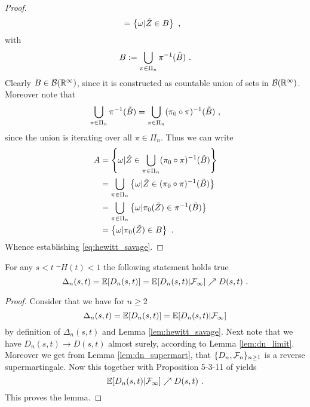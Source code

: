 \begin{lemma}
\begin{proof}
\begin{align*}
		&= \left\{\omega | \tilde{Z} \in B\right\}\textrm{ ,}
		\end{align*}		
		with 
		$$B:=\bigcup\limits_{\pi\in\Pi_n}\pi^{-1}(\tilde{B})\textrm{ .}$$
		Clearly $B\in\mathcal{B}(\mathbb{R}^\infty)$, since it is constructed as countable union of sets in $\mathcal{B}(\mathbb{R}^\infty)$.
		Moreover note that 
		$$\bigcup\limits_{\pi\in\Pi_n}\pi^{-1}(\tilde{B}) = \bigcup\limits_{\pi\in\Pi_n}(\pi_0\circ\pi)^{-1}(\tilde{B})\textrm{ ,}$$
		since the union is iterating over all $\pi\in\Pi_n$. Thus we can write
		\begin{align*}
		A &= \left\{\omega | \tilde{Z} \in \bigcup\limits_{\pi\in\Pi_n}(\pi_0\circ\pi)^{-1}(\tilde{B})\right\}\\
		&= \bigcup\limits_{\pi\in\Pi_n}\left\{\omega | \tilde{Z} \in (\pi_0\circ\pi)^{-1}(\tilde{B})\right\}\\
		&= \bigcup\limits_{\pi\in\Pi_n}\left\{\omega | \pi_0(\tilde{Z}) \in \pi^{-1}(\tilde{B})\right\}\\
		&= \left\{\omega | \pi_0(\tilde{Z}) \in B\right\}\textrm{ .}
		\end{align*}		
		Whence establishing \eqref{eq:hewitt_savage}.
	\end{proof}
\end{lemma}
%
\begin{lemma}For any $s<t$ \st\ $H(t)<1$ the following statement holds true
	$$\Delta_{n}(s,t) = \mathbb{E}[D_n(s,t)] = \mathbb{E}[D_n(s,t)|\mathcal{F}_\infty] \nearrow D(s,t)\textrm{ .}$$
	\label{lem:neveu}
	\begin{proof}
		Consider that we have for $n\geq 2$
		$$\Delta_{n}(s,t) = \mathbb{E}[D_n(s,t)] = \mathbb{E}[D_n(s,t)|\mathcal{F}_\infty] $$
		by definition of $\Delta_{n}(s,t)$ and Lemma \ref{lem:hewitt_savage}. Next note that we have $D_n(s,t) \to D(s,t)$ almost surely, according to Lemma \ref{lem:dn_limit}. Moreover we get from Lemma \ref{lem:dn_supermart}, that $\{D_n,\mathcal{F}_n\}_{n\geq 1}$ is a reverse supermartingale. Now this together with Proposition 5-3-11 of \cite{neveu1975discrete} yields
		$$\mathbb{E}[D_n(s,t)|\mathcal{F}_\infty] \nearrow D(s,t)\textrm{ .}$$
		This proves the lemma.
	\end{proof}
\end{lemma}
